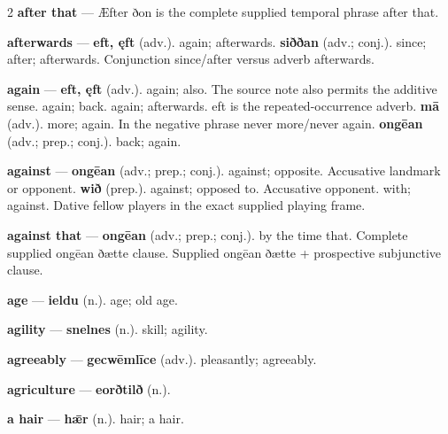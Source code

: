\begin{multicols}{2}
\textbf{after that} — Æfter ðon is the complete supplied temporal phrase after that.\par
\textbf{afterwards} — \textbf{eft, ęft} (adv.). again; afterwards. \textbf{siððan} (adv.; conj.). since; after; afterwards. Conjunction since/after versus adverb afterwards.\par
\textbf{again} — \textbf{eft, ęft} (adv.). again; also. The source note also permits the additive sense. again; back. again; afterwards. eft is the repeated-occurrence adverb. \textbf{mā} (adv.). more; again. In the negative phrase never more/never again. \textbf{ongēan} (adv.; prep.; conj.). back; again.\par
\textbf{against} — \textbf{ongēan} (adv.; prep.; conj.). against; opposite. Accusative landmark or opponent. \textbf{wið} (prep.). against; opposed to. Accusative opponent. with; against. Dative fellow players in the exact supplied playing frame.\par
\textbf{against that} — \textbf{ongēan} (adv.; prep.; conj.). by the time that. Complete supplied ongēan ðætte clause. Supplied ongēan ðætte + prospective subjunctive clause.\par
\textbf{age} — \textbf{ieldu} (n.). age; old age.\par
\textbf{agility} — \textbf{snelnes} (n.). skill; agility.\par
\textbf{agreeably} — \textbf{gecwēmlīce} (adv.). pleasantly; agreeably.\par
\textbf{agriculture} — \textbf{eorðtilð} (n.).\par
\textbf{a hair} — \textbf{hǣr} (n.). hair; a hair.\par

\end{multicols}
